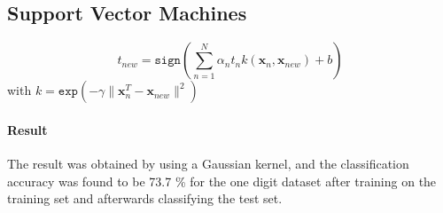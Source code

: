 \subsection*{Support Vector Machines}


\begin{equation}
t_{new} = 
\mathtt{sign}\left( \sum_{n=1}^{N} \alpha_n t_n k(\mathbf{x}_n,\mathbf{x}_{new}) +b  \right)
\end{equation}
with $ k = \mathtt{exp}(-\gamma \|\mathbf{x}^T_n - \mathbf{x}_{new} \|^2 ) $

\paragraph*{Result}
The result was obtained by using a Gaussian kernel, and the classification accuracy was found to be 73.7 \% for the one digit dataset after training on the training set and afterwards classifying the test set.